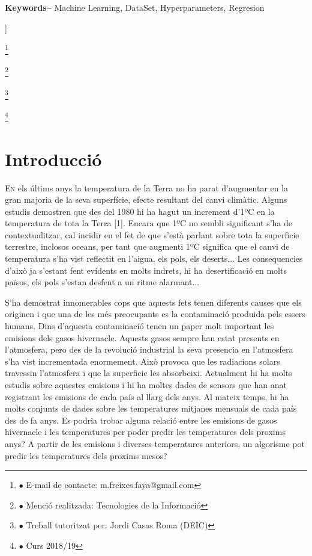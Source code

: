\documentclass[10pt,a4paper,twocolumn,twoside]{article}
\newcommand\blfootnote[1]{%
  \begingroup
  \renewcommand\thefootnote{}\footnote{#1}%
  \addtocounter{footnote}{-1}%
  \endgroup
}
\begin{document}
\begin{@twocolumnfalse}
\begin{center}
{\\
\\
\textbf{Keywords-- } Machine Learning, DataSet, Hyperparameters, Regresion\\
}

\bigskip

{\vrule depth 0pt height 0.5pt width 4cm\hspace{7.5pt}%
%
\hspace{7.5pt}\vrule depth 0pt height 0.5pt width 4cm\relax}

\end{center}

\bigskip
\end{@twocolumnfalse}]

\blfootnote{$\bullet$ E-mail de contacte: m.freixes.faya@gmail.com}
\blfootnote{$\bullet$ Menció realitzada: Tecnologies de la Informació}
\blfootnote{$\bullet$ Treball tutoritzat per: Jordi Casas Roma (DEIC)}
\blfootnote{$\bullet$ Curs 2018/19}
\section{Introducció}
\lettrine[lines=3]{E}{n} els últims anys la temperatura de la Terra no ha parat d'augmentar en la gran majoria de la seva superfície, efecte resultant del canvi climàtic. Alguns estudis demostren que des del 1980 hi ha hagut un increment d'1ºC en la temperatura de tota la Terra [1]. Encara que 1ºC no sembli significant s'ha de contextualitzar, cal incidir en el fet de que s'està parlant sobre tota la superficie terrestre, inclosos oceans, per tant que augmenti 1ºC significa que el canvi de temperatura s'ha vist reflectit en l'aigua, els pols, els deserts... Les consequencies d'això ja s'estant fent evidents en molts indrets, hi ha desertificació en molts països, els pols s'estan desfent a un ritme alarmant... 

S'ha demostrat innomerables cops que aquests fets tenen diferents causes que els originen i que una de les més preocupants es la contaminació produida pels essers humans. Dins d'aquesta contaminació tenen un paper molt important les emisions dels gasos hivernacle. Aquests gasos sempre han estat presents en l'atmosfera, pero des de la revolució industrial la seva presencia en l'atmosfera s'ha vist incrementada enormement. Això provoca que les radiacions solars travessin l'atmosfera i que la superficie les absorbeixi. Actualment hi ha molts estudis sobre aquestes emisions i hi ha moltes dades de sensors que han anat registrant les emisions de cada país al llarg dels anys. Al mateix temps, hi ha molts conjunts de dades sobre les temperatures mitjanes mensuals de cada país des de fa anys. Es podria trobar alguna relació entre les emisions de gasos hivernacle i les temperatures per poder predir les temperatures dels proxims anys? A partir de les emisions i diverses temperatures anteriors, un algorisme pot predir les temperatures dels proxims mesos?
\end{document}

